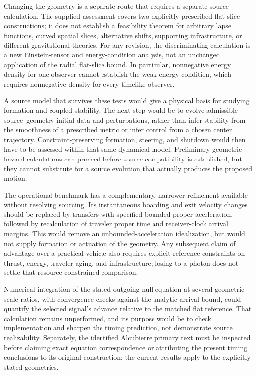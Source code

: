 \documentclass[11pt]{article}
\begin{document}
Changing the geometry is a separate route that requires a separate source calculation. The supplied assessment covers two explicitly prescribed flat-slice constructions; it does not establish a feasibility theorem for arbitrary lapse functions, curved spatial slices, alternative shifts, supporting infrastructure, or different gravitational theories. For any revision, the discriminating calculation is a new Einstein-tensor and energy-condition analysis, not an unchanged application of the radial flat-slice bound. In particular, nonnegative energy density for one observer cannot establish the weak energy condition, which requires nonnegative density for every timelike observer.

A source model that survives these tests would give a physical basis for studying formation and coupled stability. The next step would be to evolve admissible source–geometry initial data and perturbations, rather than infer stability from the smoothness of a prescribed metric or infer control from a chosen center trajectory. Constraint-preserving formation, steering, and shutdown would then have to be assessed within that same dynamical model. Preliminary geometric hazard calculations can proceed before source compatibility is established, but they cannot substitute for a source evolution that actually produces the proposed motion.

The operational benchmark has a complementary, narrower refinement available without resolving sourcing. Its instantaneous boarding and exit velocity changes should be replaced by transfers with specified bounded proper acceleration, followed by recalculation of traveler proper time and receiver-clock arrival margins. This would remove an unbounded-acceleration idealization, but would not supply formation or actuation of the geometry. Any subsequent claim of advantage over a practical vehicle also requires explicit reference constraints on thrust, energy, traveler aging, and infrastructure; losing to a photon does not settle that resource-constrained comparison.

Numerical integration of the stated outgoing null equation at several geometric scale ratios, with convergence checks against the analytic arrival bound, could quantify the selected signal’s advance relative to the matched flat reference. That calculation remains unperformed, and its purpose would be to check implementation and sharpen the timing prediction, not demonstrate source realizability. Separately, the identified Alcubierre primary text must be inspected before claiming exact equation correspondence or attributing the present timing conclusions to its original construction; the current results apply to the explicitly stated geometries.
\end{document}
